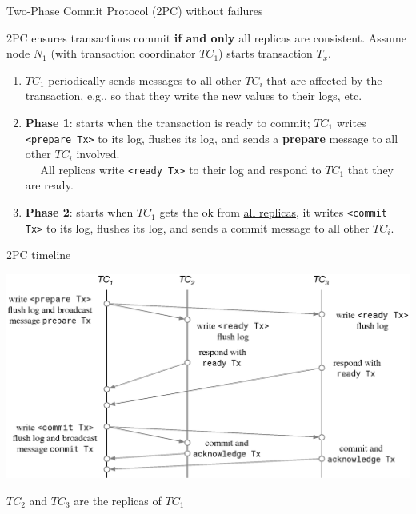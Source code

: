 \begin{frame}{Two-Phase Commit Protocol (2PC) without failures}

2PC ensures transactions commit \textbf{if and only} all replicas are consistent. Assume node $N_1$ (with transaction coordinator $\mathit{TC}_1$) starts transaction $T_x$.

\begin{enumerate}[(1),noitemsep,topsep=-10pt]
\item $\mathit{TC}_1$ periodically sends messages to all other $\mathit{TC}_i$ that are affected by the transaction, e.g., so that they write the new values to their logs, etc.

\item \textbf{\alert{Phase 1}}: starts when the transaction is ready to commit; $\mathit{TC}_1$ writes \lstinline[style=cmput391]!<prepare Tx>! to its log, flushes its log, and sends a \textbf{prepare} message to all other $\mathit{TC}_i$ involved.\\
~~ All replicas write \lstinline[style=cmput391]!<ready Tx>! to their log and respond to $\mathit{TC}_1$ that they are ready.

\item \textbf{\alert{Phase 2}}: starts when $\mathit{TC}_1$ gets the ok from \underline{all replicas}, it writes \lstinline[style=cmput391]!<commit Tx>! to its log, flushes its log, and sends a commit message to all other $\mathit{TC}_i$.
\end{enumerate}
\end{frame}


%
%

\begin{frame}{2PC timeline}
\begin{center}
\includegraphics[width=\textwidth]{figures/2PC_example.eps}
\end{center}

$\mathit{TC}_2$ and $\mathit{TC}_3$ are the replicas of $\mathit{TC}_1$
\end{frame}

